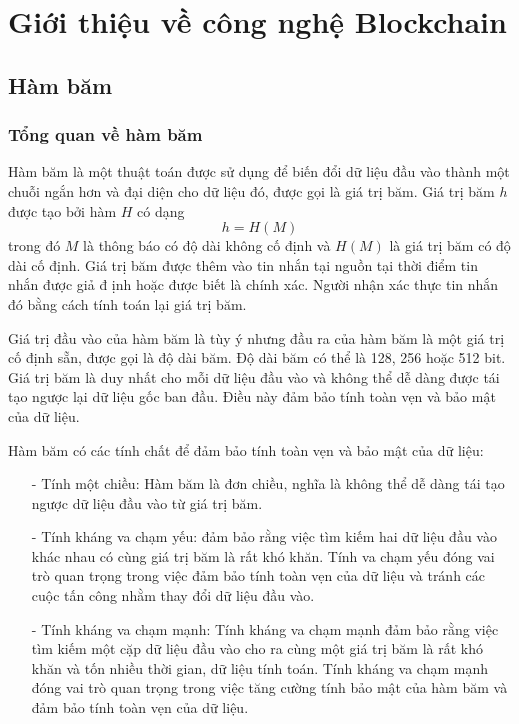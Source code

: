 \chapter{Giới thiệu về công nghệ Blockchain}
\label{chap: blockchain}
\section{Hàm băm}
\subsection{Tổng quan về hàm băm}
Hàm băm là một thuật toán được sử dụng để biến đổi dữ liệu đầu vào thành một chuỗi ngắn hơn và đại diện
cho dữ liệu đó, được gọi là giá trị băm.
Giá trị băm $h$ được tạo bởi hàm $H$ có dạng
$$h = H(M)$$ 
trong đó $M$ là thông báo có độ dài không cố định và $H(M)$ là giá trị băm có độ dài cố 
định. Giá trị băm được thêm vào tin nhắn tại nguồn tại thời điểm tin nhắn được giả đ
ịnh hoặc được biết là chính xác. Người nhận xác thực tin nhắn đó bằng cách tính toán 
lại giá trị băm.\cite{hashfunction}

Giá trị đầu vào của hàm băm là tùy ý nhưng đầu ra của hàm băm là một giá trị 
cố định sẵn, được gọi là độ dài băm. Độ dài băm có thể là 128, 256 hoặc 512 bit.
Giá trị băm là duy nhất cho mỗi dữ liệu đầu vào và không thể dễ dàng được tái tạo ngược lại dữ liệu gốc ban đầu. Điều này đảm bảo tính toàn vẹn và 
bảo mật của dữ liệu.


Hàm băm có các tính chất để đảm bảo tính toàn vẹn và bảo mật của dữ liệu:
\begin{itemize}
\item[-] Tính một chiều: Hàm băm là đơn chiều, nghĩa là không thể dễ dàng 
tái tạo ngược dữ liệu đầu vào từ giá trị băm.
\item[-] Tính kháng va chạm yếu: đảm bảo rằng việc tìm kiếm hai dữ liệu đầu vào khác nhau có cùng 
giá trị băm là rất khó khăn. Tính va chạm yếu đóng vai trò quan trọng trong việc đảm bảo tính toàn
vẹn của dữ liệu và tránh các cuộc tấn công nhằm thay đổi dữ liệu đầu vào. 
\item[-] Tính kháng va chạm mạnh:  Tính kháng va chạm mạnh đảm bảo rằng việc tìm kiếm một cặp dữ 
liệu đầu vào cho ra cùng một giá trị băm là rất khó khăn và tốn nhiều thời gian, dữ liệu tính toán.
Tính kháng va chạm mạnh đóng vai trò quan trọng trong việc tăng cường tính bảo mật của hàm băm và 
đảm bảo tính toàn vẹn của dữ liệu.
\item[] 
\end{itemize}

